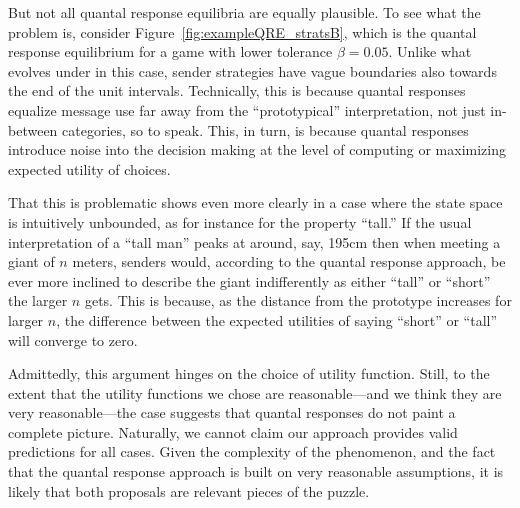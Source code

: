 \documentclass[fleqn,reqno,10pt]{article}
\newcommand{\rdd}{\acro{rdd}} %
\newcommand{\toler}{\ensuremath{\beta}} %
\begin{document}
But not all quantal response equilibria are equally plausible.
To see what the problem is, consider
Figure~\ref{fig:exampleQRE_stratsB}, which is the quantal response
equilibrium for a game with lower tolerance $\toler = 0.05$. Unlike
what evolves under \rdd in this case, sender strategies have vague
boundaries also towards the end of the unit intervals. Technically,
this is because quantal responses equalize message use far away from
the ``prototypical'' interpretation, not just in-between categories,
so to speak. This, in turn, is because quantal responses introduce
noise into the decision making at the level of computing or maximizing
expected utility of choices.

That this is problematic shows even more clearly in a case where
the state space is intuitively unbounded, as for instance for the
property ``tall.'' If the usual interpretation of a ``tall man'' peaks
at around, say, 195cm then when meeting a giant of $n$ meters, senders
would, according to the quantal response approach, be ever more
inclined to describe the giant indifferently as either ``tall'' or
``short'' the larger $n$ gets. This is because, as the distance from
the prototype increases for larger $n$, the difference between the
expected utilities of saying ``short'' or ``tall'' will converge to
zero. 

Admittedly, this argument hinges on the choice of utility
function. Still, to the extent that the utility functions we chose are
reasonable---and we think they are very reasonable---the case
suggests that quantal responses do not paint a complete picture. Naturally,
we cannot claim our approach provides valid predictions for all cases.
Given the complexity of the phenomenon, and the fact that
the quantal response approach is built on very reasonable assumptions,
it is likely that both proposals are relevant pieces of the puzzle.

\end{document}
